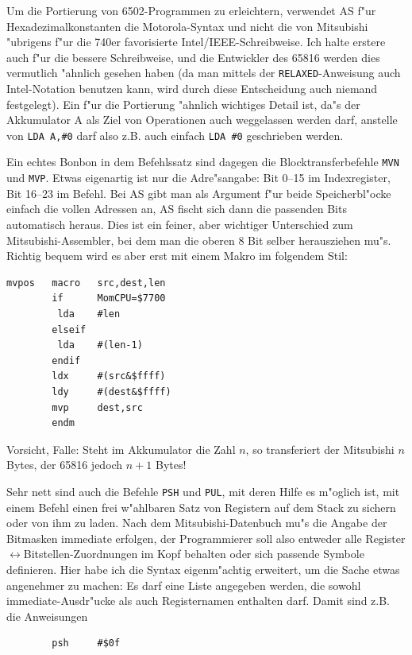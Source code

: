 \documentclass[12pt,a4paper,twoside]{report}
\newcommand{\tty}[1]{{\tt #1}}
\newcommand{\asname}{AS}
\begin{document}
Um die Portierung von 6502-Programmen zu erleichtern, verwendet \asname{} f"ur
Hexadezimalkonstanten die Motorola-Syntax und nicht die von Mitsubishi
"ubrigens f"ur die 740er favorisierte Intel/IEEE-Schreibweise.
Ich halte erstere auch f"ur die bessere Schreibweise, und die Entwickler
des 65816 werden dies vermutlich "ahnlich gesehen haben (da man mittels
der \tty{RELAXED}-Anweisung auch Intel-Notation benutzen kann, wird durch
diese Entscheidung auch niemand festgelegt).  Ein f"ur die
Portierung "ahnlich wichtiges Detail ist, da"s der Akkumulator A als
Ziel von Operationen auch weggelassen werden darf, anstelle von
\tty{LDA A,\#0} darf also z.B. auch einfach \tty{LDA \#0} geschrieben
werden.
\par
Ein echtes Bonbon in dem Befehlssatz sind dagegen die Blocktransferbefehle
\tty{MVN} und \tty{MVP}.  Etwas eigenartig ist nur die Adre"sangabe:
Bit 0--15 im Indexregister, Bit 16--23 im Befehl.  Bei \asname{} gibt  man als
Argument f"ur beide Speicherbl"ocke einfach die vollen Adressen an, \asname{}
fischt sich dann die passenden Bits automatisch heraus.  Dies ist ein
feiner, aber wichtiger Unterschied zum Mitsubishi-Assembler, bei dem
man die oberen 8 Bit selber herausziehen mu"s.  Richtig bequem
wird es aber erst mit einem Makro im folgendem Stil:
\begin{verbatim}
mvpos   macro   src,dest,len
        if      MomCPU=$7700
         lda    #len
        elseif
         lda    #(len-1)
        endif
        ldx     #(src&$ffff)
        ldy     #(dest&$ffff)
        mvp     dest,src
        endm
\end{verbatim}
Vorsicht, Falle: Steht im Akkumulator die Zahl $n$, so transferiert
der Mitsubishi $n$ Bytes, der 65816 jedoch $n+1$ Bytes!
\par
Sehr nett sind auch die Befehle \tty{PSH} und \tty{PUL}, mit deren Hilfe es
m"oglich ist, mit einem Befehl einen frei w"ahlbaren Satz von Registern
auf dem Stack zu sichern oder von ihm zu laden.  Nach dem
Mitsubishi-Datenbuch\cite{Mit16} mu"s die Angabe der Bitmasken immediate
erfolgen, der Programmierer soll also entweder alle
Register$\leftrightarrow$Bitstellen-Zuordnungen im Kopf behalten oder
sich passende Symbole definieren.  Hier habe ich die Syntax eigenm"achtig
erweitert, um die Sache etwas angenehmer zu machen: Es darf eine Liste
angegeben werden, die sowohl immediate-Ausdr"ucke als auch Registernamen
enthalten darf.  Damit sind z.B. die Anweisungen
\begin{verbatim}
        psh     #$0f
\end{verbatim}
\end{document}

